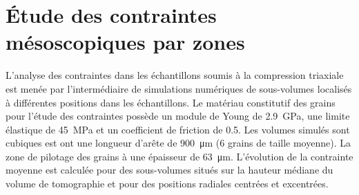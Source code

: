 \section{\'Etude des contraintes mésoscopiques par zones} %
	L'analyse des contraintes dans les échantillons soumis à la compression triaxiale est menée par l'intermédiaire de simulations numériques de sous-volumes localisés à différentes positions dans les échantillons. Le matériau constitutif des grains pour l'étude des contraintes possède un module de Young de \SI{2.9}{\giga\pascal}, une limite élastique de \SI{45}{\mega\pascal} et un coefficient de friction de \num{0.5}. Les volumes simulés sont cubiques est ont une longueur d'arête de \SI{900}{\micro\meter} (\num{6} grains de taille moyenne). La zone de pilotage des grains à une épaisseur de \SI{63}{\micro\meter}. L'évolution de la contrainte moyenne est calculée pour des sous-volumes situés sur la hauteur médiane du volume de tomographie et pour des positions radiales centrées et excentrées.
